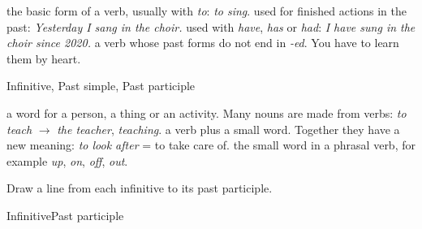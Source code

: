 \documentclass[11pt]{article}
\begin{document}

\begin{keyterms}
    {the basic form of a verb, usually with \textit{to}:
     \textit{to sing}.}
    {used for finished actions in the past:
     \textit{Yesterday I sang in the choir.}}
    {used with \textit{have}, \textit{has} or \textit{had}:
     \textit{I have sung in the choir since 2020.}}
    {a verb whose past forms do not end in \textit{-ed}.
     You have to learn them by heart.}

  \begin{formtable}{Infinitive, Past simple, Past participle}
  \end{formtable}

    {a word for a person, a thing or an activity. Many nouns are made
     from verbs: \textit{to teach} $\rightarrow$ \textit{the teacher},
     \textit{teaching}.}
    {a verb plus a small word. Together they have a new meaning:
     \textit{to look after} = to take care of.}
    {the small word in a phrasal verb, for example \textit{up}, \textit{on},
     \textit{off}, \textit{out}.}
\end{keyterms}

\clearpage


%
  {Draw a line from each infinitive to its past participle.}

\begin{matching}{Infinitive}{Past participle}
\end{matching}
\end{document}
